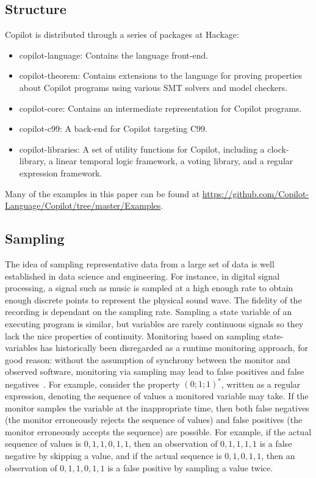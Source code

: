 \subsection{Structure} \label{structure}

\noindent Copilot is distributed through a series of packages at Hackage:

\begin{itemize}
\item copilot-language: Contains the language front-end.
\item copilot-theorem: Contains extensions to the language for proving
properties about Copilot programs using various SMT solvers and model checkers.
\item copilot-core: Contains an intermediate representation for Copilot programs.
\item copilot-c99: A back-end for Copilot targeting C99.
\item copilot-libraries: A set of utility functions for Copilot, including a
clock-library, a linear temporal logic framework, a voting library, and a regular
expression framework.
\end{itemize}

Many of the examples in this paper can be found at
\url{https://github.com/Copilot-Language/Copilot/tree/master/Examples}.

\subsection{Sampling} \label{sampling}
 The idea of sampling representative data from a large set of data  is well
established in data science and engineering.
%
 For instance, in digital signal processing, a signal such as music is sampled
at a high enough rate to obtain enough discrete points to represent the
physical sound wave.
%
 The fidelity of the recording is dependant on the sampling rate.
%
 Sampling a state variable of an executing program is similar, but variables
are rarely continuous signals so they lack the nice properties of continuity.
%
Monitoring based on sampling state-variables has historically been disregarded
as a runtime monitoring approach, for good reason: without the assumption of
synchrony between the monitor and observed software, monitoring via sampling
may lead to false positives and false negatives~\cite{DwyerDE08}.
%
 For example, consider the property $(0;1;1)^*$, written as a regular
expression, denoting the sequence of values a monitored variable may take.
%
 If the monitor samples the variable at the inappropriate time, then both false
negatives (the monitor erroneously rejects the sequence of values) and false
positives (the monitor erroneously accepts the sequence) are possible. 
%
 For example, if the actual sequence of values is $0,1,1,0,1,1$, then an
observation of $0,1,1,1,1$ is a false negative by skipping a value, and if the
actual sequence is $0,1,0,1,1$, then an observation of $0,1,1,0,1,1$ is a false
positive by sampling a value twice.
%


